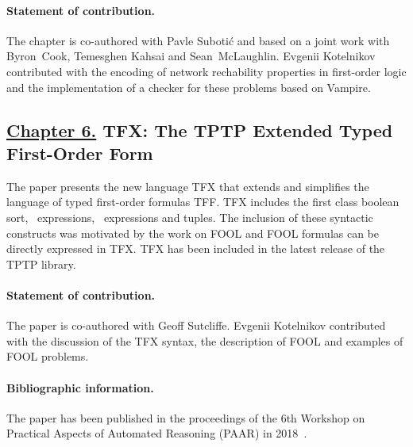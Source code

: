 \paragraph{Statement of contribution.} The chapter is co-authored with Pavle Suboti\'{c} and based on a joint work with Byron~Cook, Temesghen Kahsai and Sean~McLaughlin. Evgenii Kotelnikov contributed with the encoding of network rechability properties in first-order logic and the implementation of a checker for these problems based on Vampire.

\subsection*{\hyperref[chap:tfx]{Chapter 6.} TFX: The TPTP Extended Typed First-Order Form}
The paper presents the new language TFX that extends and simplifies the language of typed first-order formulas TFF. TFX includes the first class boolean sort, \ITE\ expressions, \LETIN\ expressions and tuples. The inclusion of these syntactic constructs was motivated by the work on FOOL and FOOL formulas can be directly expressed in TFX. TFX has been included in the latest release of the TPTP library.

\paragraph{Statement of contribution.} The paper is co-authored with Geoff Sutcliffe. Evgenii Kotelnikov contributed with the discussion of the TFX syntax, the description of FOOL and examples of FOOL problems.

\paragraph{Bibliographic information.} The paper has been published in the proceedings of the 6th Workshop on Practical Aspects of Automated Reasoning (PAAR) in 2018~\cite{SutcliffeK18}.
